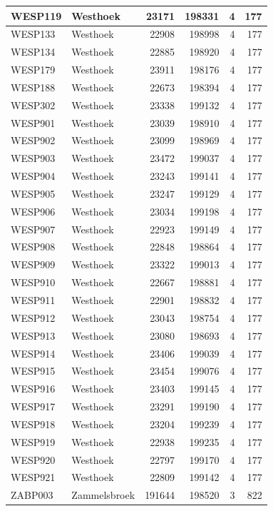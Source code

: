 \documentclass[11pt,]{book}
\begin{document}
\begin{table}
\begin{tabular}[t]{l|l|r|r|r|r}
\hline
WESP119 & Westhoek & 23171 & 198331 & 4 & 177\\
\hline
WESP133 & Westhoek & 22908 & 198998 & 4 & 177\\
\hline
WESP134 & Westhoek & 22885 & 198920 & 4 & 177\\
\hline
WESP179 & Westhoek & 23911 & 198176 & 4 & 177\\
\hline
WESP188 & Westhoek & 22673 & 198394 & 4 & 177\\
\hline
WESP302 & Westhoek & 23338 & 199132 & 4 & 177\\
\hline
WESP901 & Westhoek & 23039 & 198910 & 4 & 177\\
\hline
WESP902 & Westhoek & 23099 & 198969 & 4 & 177\\
\hline
WESP903 & Westhoek & 23472 & 199037 & 4 & 177\\
\hline
WESP904 & Westhoek & 23243 & 199141 & 4 & 177\\
\hline
WESP905 & Westhoek & 23247 & 199129 & 4 & 177\\
\hline
WESP906 & Westhoek & 23034 & 199198 & 4 & 177\\
\hline
WESP907 & Westhoek & 22923 & 199149 & 4 & 177\\
\hline
WESP908 & Westhoek & 22848 & 198864 & 4 & 177\\
\hline
WESP909 & Westhoek & 23322 & 199013 & 4 & 177\\
\hline
WESP910 & Westhoek & 22667 & 198881 & 4 & 177\\
\hline
WESP911 & Westhoek & 22901 & 198832 & 4 & 177\\
\hline
WESP912 & Westhoek & 23043 & 198754 & 4 & 177\\
\hline
WESP913 & Westhoek & 23080 & 198693 & 4 & 177\\
\hline
WESP914 & Westhoek & 23406 & 199039 & 4 & 177\\
\hline
WESP915 & Westhoek & 23454 & 199076 & 4 & 177\\
\hline
WESP916 & Westhoek & 23403 & 199145 & 4 & 177\\
\hline
WESP917 & Westhoek & 23291 & 199190 & 4 & 177\\
\hline
WESP918 & Westhoek & 23204 & 199239 & 4 & 177\\
\hline
WESP919 & Westhoek & 22938 & 199235 & 4 & 177\\
\hline
WESP920 & Westhoek & 22797 & 199170 & 4 & 177\\
\hline
WESP921 & Westhoek & 22809 & 199142 & 4 & 177\\
\hline
ZABP003 & Zammelsbroek & 191644 & 198520 & 3 & 822\\

\end{tabular}
\end{table}
\end{document}
